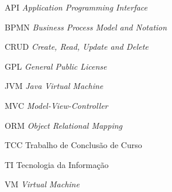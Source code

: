 \begin{siglas}
  \item[API] \textit{Application Programming Interface}
  \item[BPMN] \textit{Business Process Model and Notation}
  \item[CRUD] \textit{Create, Read, Update and Delete} 
  \item[GPL] \textit{General Public License} 
  \item[JVM] \textit{Java Virtual Machine}
  \item[MVC] \textit{Model-View-Controller}
  \item[ORM] \textit{Object Relational Mapping}
  \item[TCC] Trabalho de Conclusão de Curso
  \item[TI]  Tecnologia da Informação
  \item[VM]  \textit{Virtual Machine}
\end{siglas}
